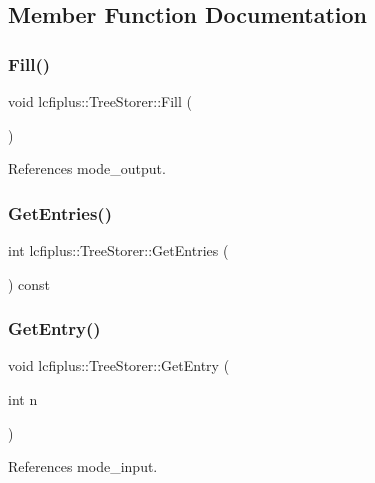 \subsection{Member Function Documentation}
\mbox{\label{classlcfiplus_1_1TreeStorer_a55cefa3b24055750825cb1b2b09e824d}} 
\subsubsection{Fill()}
{\footnotesize\ttfamily void lcfiplus\+::\+Tree\+Storer\+::\+Fill (\begin{DoxyParamCaption}{ }\end{DoxyParamCaption})}



References mode\+\_\+output.

\mbox{\label{classlcfiplus_1_1TreeStorer_a5b0a55cf63851b501a132ac446bbc350}} 
\subsubsection{Get\+Entries()}
{\footnotesize\ttfamily int lcfiplus\+::\+Tree\+Storer\+::\+Get\+Entries (\begin{DoxyParamCaption}{ }\end{DoxyParamCaption}) const\hspace{0.3cm}{\ttfamily [inline]}}

\mbox{\label{classlcfiplus_1_1TreeStorer_a586b89f6230aca5ceeedb2095c3271f0}} 
\subsubsection{Get\+Entry()}
{\footnotesize\ttfamily void lcfiplus\+::\+Tree\+Storer\+::\+Get\+Entry (\begin{DoxyParamCaption}\item[{int}]{n }\end{DoxyParamCaption})}



References mode\+\_\+input.

